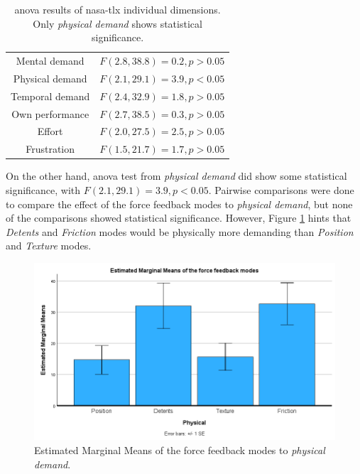 \begin{table}[h!]
	\centering
	\begin{tabular}{ |c|c| }
		\hline
		\thead{Dimension} & \thead{\gls{anova}} \\
		\hline
		Mental demand & $F(2.8, 38.8) = 0.2, p > 0.05$ \\
		\hline
		Physical demand & $F(2.1, 29.1) = 3.9, p < 0.05$ \\
		\hline
		Temporal demand & $F(2.4, 32.9) = 1.8, p > 0.05$ \\
		\hline
		Own performance & $F(2.7, 38.5) = 0.3, p > 0.05$ \\
		\hline
		Effort & $F(2.0, 27.5) = 2.5, p > 0.05$ \\
		\hline
		Frustration & $F(1.5, 21.7) = 1.7, p > 0.05$ \\
		\hline
	\end{tabular}
	\caption{\gls{anova} results of \gls{nasa-tlx} individual dimensions. Only \textit{physical demand} shows statistical significance.}
	\label{tlx-anova}
\end{table}

On the other hand, \gls{anova} test from \textit{physical demand} did show some statistical significance, with $F(2.1, 29.1) = 3.9, p < 0.05$. Pairwise comparisons were done to compare the effect of the force feedback modes to \textit{physical demand}, but none of the comparisons showed statistical significance. However, Figure \ref{tlx-physical-chart} hints that \textit{Detents} and \textit{Friction} modes would be physically more demanding than \textit{Position} and \textit{Texture} modes.

\begin{figure}[h!]
	\centering
	\includegraphics[width=1.0\linewidth]{figures/tlx-anova.png}
	\caption{Estimated Marginal Means of the force feedback modes to \textit{physical demand}.}
	\label{tlx-physical-chart}
\end{figure}

